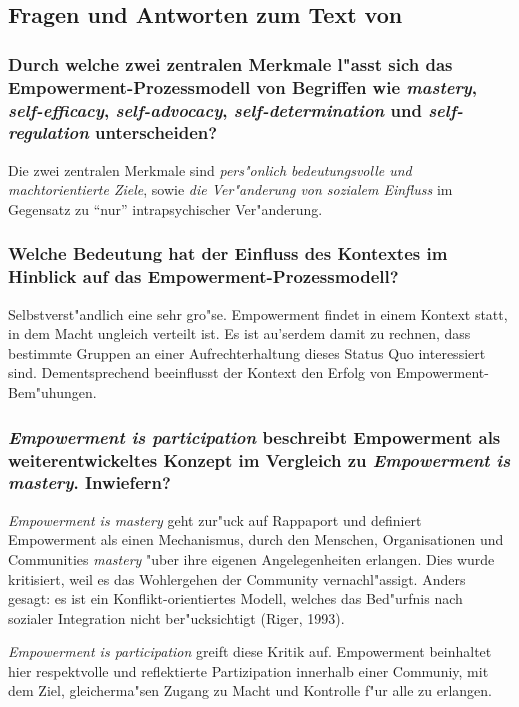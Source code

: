 \subsection{Fragen und Antworten zum Text von \textcite{cattaneo_process_2010}}
\subsubsection{Durch welche zwei zentralen Merkmale l"asst sich das Empowerment-Prozessmodell von Begriffen wie \emph{mastery}, \emph{self-efficacy}, \emph{self-advocacy}, \emph{self-determination} und \emph{self-regulation} unterscheiden?}
Die zwei zentralen Merkmale sind \emph{pers"onlich bedeutungsvolle und machtorientierte Ziele}, sowie \emph{die Ver"anderung von sozialem Einfluss} im Gegensatz zu ``nur'' intrapsychischer Ver"anderung.

\subsubsection{Welche Bedeutung hat der Einfluss des Kontextes im Hinblick auf das Empowerment-Prozessmodell?}
Selbstverst"andlich eine sehr gro"se. Empowerment findet in einem Kontext statt, in dem Macht ungleich verteilt ist. Es ist au'serdem damit zu rechnen, dass bestimmte Gruppen an einer Aufrechterhaltung dieses Status Quo interessiert sind. Dementsprechend beeinflusst der Kontext den Erfolg von Empowerment-Bem"uhungen.

\subsubsection{\emph{Empowerment is participation} beschreibt Empowerment als weiterentwickeltes Konzept im Vergleich zu \emph{Empowerment is mastery}. Inwiefern?}
\emph{Empowerment is mastery} geht zur"uck auf Rappaport und definiert Empowerment als einen Mechanismus, durch den Menschen, Organisationen und Communities \emph{mastery} "uber ihre eigenen Angelegenheiten erlangen. Dies wurde kritisiert, weil es das Wohlergehen der Community vernachl"assigt. Anders gesagt: es ist ein Konflikt-orientiertes Modell, welches das Bed"urfnis nach sozialer Integration nicht ber"ucksichtigt (Riger, 1993). 

\emph{Empowerment is participation} greift diese Kritik auf. Empowerment beinhaltet hier respektvolle und reflektierte Partizipation innerhalb einer Communiy,  mit dem Ziel, gleicherma"sen Zugang zu Macht und Kontrolle f"ur alle zu erlangen.

